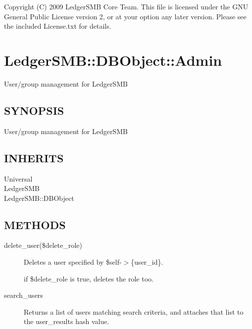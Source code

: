 \begin{description}
\begin{description}
\begin{description}
\begin{description}
\begin{description}
\begin{description}
\begin{description}
\begin{description}
\begin{description}
Copyright (C) 2009 LedgerSMB Core Team.  This file is licensed under the GNU 
General Public License version 2, or at your option any later version.  Please
see the included License.txt for details.

\section{LedgerSMB::DBObject::Admin\label{LedgerSMB::DBObject::Admin}}


User/group management for LedgerSMB

\subsection*{SYNOPSIS\label{LedgerSMB::DBObject::Admin_SYNOPSIS}}


User/group management for LedgerSMB

\subsection*{INHERITS\label{LedgerSMB::DBObject::Admin_INHERITS}}
\begin{description}

\item[{Universal}] \mbox{}
\item[{LedgerSMB}] \mbox{}
\item[{LedgerSMB::DBObject}] \mbox{}\end{description}
\subsection*{METHODS\label{LedgerSMB::DBObject::Admin_METHODS}}
\begin{description}

\item[{delete\_user(\$delete\_role)}] \mbox{}

Deletes a user specified by \$self-$>$\{user\_id\}.



if \$delete\_role is true, deletes the role too.


\item[{search\_users}] \mbox{}

Returns a list of users matching search criteria, and attaches that list to the 
user\_results hash value.




\end{description}
\end{description}
\end{description}
\end{description}
\end{description}
\end{description}
\end{description}
\end{description}
\end{description}
\end{description}
